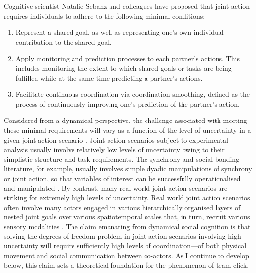 \begin{CJK}{UTF8}{gbsn}
Cognitive scientist Natalie Sebanz and colleagues \citep{Sebanz2006,Vesper2010} have proposed that joint action requires individuals to adhere to the following minimal conditions:

\begin{enumerate}
  \item Represent a shared goal, as well as representing one's own individual contribution to the shared goal.
  \item Apply monitoring and prediction processes to each partner's actions. This includes monitoring the extent to which shared goals or tasks are being fulfilled while at the same time predicting a partner's actions.
  \item Facilitate continuous coordination via coordination smoothing, defined as the process of continuously improving one's prediction of the partner's action.
\end{enumerate}

Considered from a dynamical perspective, the challenge associated with meeting these minimal requirements will vary as a function of the level of uncertainty in a given joint action scenario \citep{Turvey1982}.  Joint action scenarios subject to experimental analysis usually involve relatively low levels of uncertainty owing to their simplistic structure and task requirements.  The synchrony and social bonding literature, for example, usually involves simple dyadic manipulations of synchrony or joint action, so that variables of interest can be successfully operationalised and manipulated \citep{Launay2016,Mogan2017}.  By contrast, many real-world joint action scenarios are striking for extremely high levels of uncertainty.  Real world joint action scenarios often involve many actors engaged in various hierarchically organised layers of nested joint goals over various spatiotemporal scales that, in turn, recruit various sensory modalities \citep{Keller2014}.  The claim emanating from dynamical social cognition is that solving the degrees of freedom problem in joint action scenarios involving high uncertainty will require sufficiently high levels of coordination---of both physical movement and social communication between co-actors.  As I continue to develop below, this claim sets a theoretical foundation for the phenomenon of team click.


\end{CJK}
